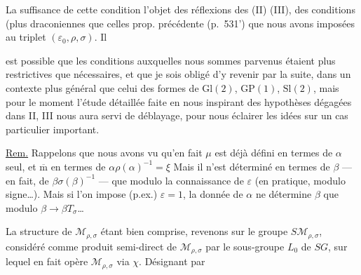 
La suffisance de cette condition 
l'objet des réflexions des (II) (III),
 des conditions (plus draconiennes que celles
 prop. précédente (p.~531') que nous
avons imposées au triplet $(\varepsilon_0,\rho,\sigma)$. Il



est possible que les conditions auxquelles nous
 sommes parvenus étaient plus restrictives
que nécessaires, et que je sois obligé
d'y revenir par la suite, dans un contexte
plus général que celui des formes de
$\mathrm{Gl}(2)$, $\mathrm{GP}(1)$, $\mathrm{Sl}(2)$, mais pour le moment
l'étude détaillée faite en nous inspirant
des hypothèses dégagées dans  II, III nous
aura servi de déblayage, pour nous éclairer
les idées sur un cas particulier
important.

\uline{Rem.} Rappelons que nous avons vu qu'en
fait $\mu$ est déjà défini en termes de $\alpha$ seul,
et $\overline{\mathrm m}$ en termes de $\alpha\rho(\alpha)^{-1}=\xi$ \unsure{;} 
Mais il n'est déterminé en termes de $\beta$
--- en fait, de $\beta\sigma(\beta)^{-1}$ --- que modulo
la connaissance de $\varepsilon$ (en pratique, modulo
signe\ldots). Mais si l'on impose (p.ex.) $\varepsilon=1$,
la donnée de $\alpha$ ne détermine $\beta$ que
modulo \deleted{$\unsure{\beta}$} $\beta\longrightarrow\beta T_\sigma$\ldots



La structure de $\mathcal M_{\rho,\sigma}$ étant bien comprise,
revenons sur le groupe $S\mathcal M_{\rho,\sigma}$, considéré comme
produit semi-direct de $\mathcal M_{\rho,\sigma}$ par le sous-groupe
$L_0$ de $SG$, sur lequel en fait opère $\mathcal M_{\rho,\sigma}$
via $\chi$. Désignant par


